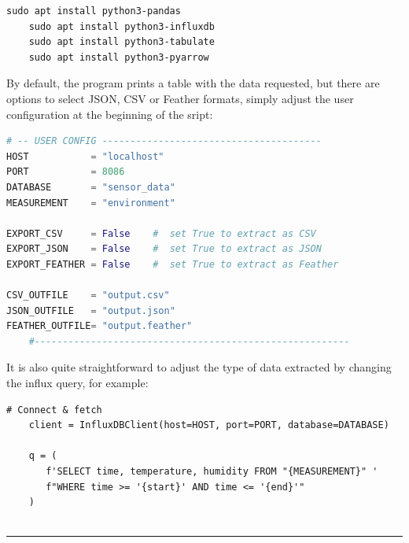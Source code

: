 \documentclass[onecolumn]{article}
\begin{document}
\begin{lstlisting}[numbers=none]
    sudo apt install python3-pandas
    sudo apt install python3-influxdb
    sudo apt install python3-tabulate
    sudo apt install python3-pyarrow
\end{lstlisting}

By default, the program prints a table with the data requested, but there are options to select JSON, CSV or Feather formats, simply adjust the user configuration at the beginning of the sript:
\begin{lstlisting}[numbers=none, language=python]
    # -- USER CONFIG --------------------------------------- 
HOST           = "localhost"
PORT           = 8086
DATABASE       = "sensor_data"
MEASUREMENT    = "environment"

EXPORT_CSV     = False    #  set True to extract as CSV
EXPORT_JSON    = False    #  set True to extract as JSON
EXPORT_FEATHER = False    #  set True to extract as Feather

CSV_OUTFILE    = "output.csv"
JSON_OUTFILE   = "output.json"
FEATHER_OUTFILE= "output.feather"
    #--------------------------------------------------------
\end{lstlisting}

It is also quite straightforward to adjust the type of data extracted by changing the influx query, for example:

\begin{lstlisting}[numbers=none]
    # Connect & fetch
    client = InfluxDBClient(host=HOST, port=PORT, database=DATABASE)
    
    q = (
       f'SELECT time, temperature, humidity FROM "{MEASUREMENT}" '
       f"WHERE time >= '{start}' AND time <= '{end}'"
    )
    
\end{lstlisting}




\balance  %

\vspace{1ex}
\noindent\hspace*{\fill}\rule{0.33\textwidth}{0.6pt}\hspace*{\fill}
\vspace{1ex}


\end{document}
